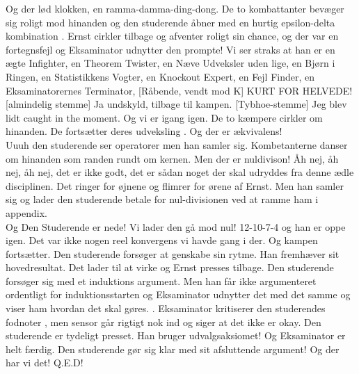 \documentclass[a4paper,11pt]{article}
\begin{document}
\begin{sketch}
Og der lød klokken, en ramma-damma-ding-dong. De to kombattanter bevæger sig roligt mod hinanden og den studerende åbner med en hurtig epsilon-delta kombination . Ernst cirkler tilbage og afventer roligt sin chance, og der var en fortegnsfejl  og Eksaminator udnytter den prompte!  Vi ser straks at han er en ægte Infighter, en Theorem Twister, en Næve Udveksler uden lige, en Bjørn i Ringen,  en Statistikkens Vogter, en Knockout Expert, en Fejl Finder, en Eksaminatorernes Terminator,
[Råbende, vendt mod K] KURT FOR HELVEDE!
[almindelig stemme] Ja undskyld, tilbage til kampen.
[Tybhoe-stemme] Jeg blev lidt caught in the moment. %
Og vi er igang igen. De to kæmpere cirkler om hinanden.  De fortsætter deres udveksling . Og der er ækvivalens!  \\
Uuuh den studerende ser operatorer  men han samler sig.
Kombetanterne danser om hinanden som randen rundt om kernen. Men der er nuldivison!   Åh nej, åh nej, åh nej, det er ikke godt, det er sådan noget der skal udryddes fra denne ædle disciplinen. Det ringer for øjnene og flimrer for ørene af Ernst. Men han samler sig og lader den studerende betale for nul-divisionen ved at ramme ham i appendix.  \\
Og Den Studerende er nede! Vi lader den gå mod nul! 12-10-7-4 og han er oppe igen. Det var ikke nogen reel konvergens vi havde gang i der.  Og kampen fortsætter. Den studerende forsøger at genskabe sin rytme. Han fremhæver sit hovedresultat. \act{} Det lader til at virke og Ernst presses tilbage. Den studerende forsøger sig med et induktions argument. Men han får ikke argumenteret ordentligt for induktionsstarten  og Eksaminator udnytter det med det samme og viser ham hvordan det skal gøres. . Eksaminator kritiserer den studerendes fodnoter , men sensor går rigtigt nok ind og siger at det ikke er okay.
Den studerende er tydeligt presset. Han bruger udvalgsaksiomet!  Og Eksaminator er helt færdig. Den studerende gør sig klar med sit afsluttende argument! Og der har vi det! Q.E.D!  

\end{sketch}
\end{document}
